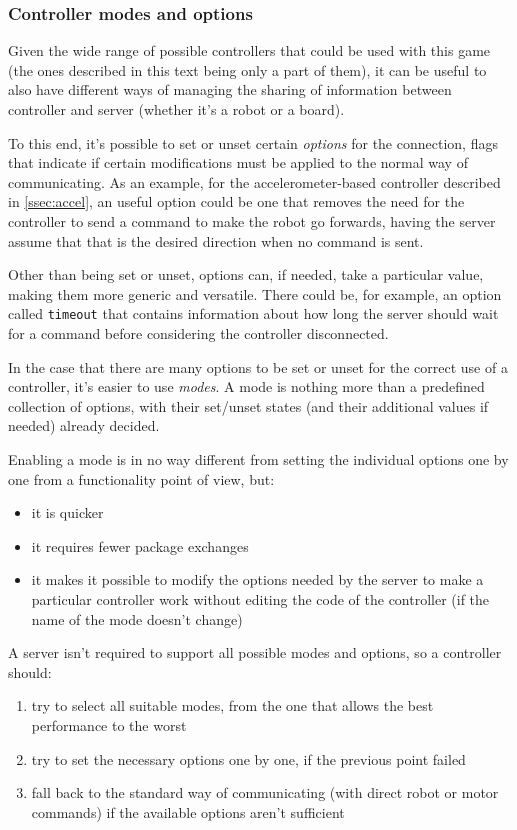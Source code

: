 \subsubsection{Controller modes and options}
  \label{sssec:optmode}
  Given the wide range of possible controllers that could be used
  with this game (the ones described in this text being only a part
  of them), it can be useful to also have different ways of managing
  the sharing of information between controller and server (whether
  it's a robot or a board).

  To this end, it's possible to set or unset certain
  \textit{options} for the connection, flags that indicate if
  certain modifications must be applied to the normal way of
  communicating. As an example, for the accelerometer-based
  controller described in \ref{ssec:accel}, an useful option could
  be one that removes the need for the controller to send a command
  to make the robot go forwards, having the server assume that that
  is the desired direction when no command is sent.

  Other than being set or unset, options can, if needed, take a
  particular value, making them more generic and versatile. There
  could be, for example, an option called \texttt{timeout} that
  contains information about how long the server should wait for a
  command before considering the controller disconnected.

  In the case that there are many options to be set or unset for the
  correct use of a controller, it's easier to use \textit{modes}. A
  mode is nothing more than a predefined collection of options, with
  their set/unset states (and their additional values if needed)
  already decided.

  Enabling a mode is in no way different from setting the individual
  options one by one from a functionality point of view, but:
  \begin{itemize}
  \item it is quicker
  \item it requires fewer package exchanges
  \item it makes it possible to modify the options needed by the
    server to make a particular controller work without editing the
    code of the controller (if the name of the mode doesn't change)
  \end{itemize}

  A server isn't required to support all possible modes and options,
  so a controller should:
  \begin{enumerate}
  \item try to select all suitable modes, from the one that allows
    the best performance to the worst
  \item try to set the necessary options one by one, if the previous
    point failed
  \item fall back to the standard way of communicating (with direct
    robot or motor commands) if the available options aren't
    sufficient
  \end{enumerate}
